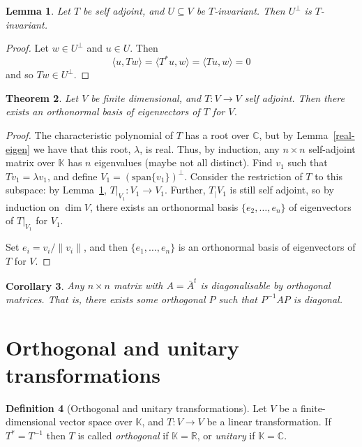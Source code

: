 \documentclass[10pt,fleqn]{article}
\newcommand{\spa}{\mathrm{span}}
\newcommand{\comps}{\mathbb{C}}
\newcommand{\reals}{\mathbb{R}}
\theoremstyle{definition} \newtheorem{defn}{Definition}[section]
\theoremstyle{plain}      \newtheorem{thm}[defn]{Theorem}
\theoremstyle{plain}      \newtheorem{prop}[defn]{Proposition}
\theoremstyle{plain}      \newtheorem{lem}[defn]{Lemma}
\theoremstyle{plain}      \newtheorem{cor}[defn]{Corollary}
\theoremstyle{plain}      \newtheorem{ad}[defn]{Addendum}
\theoremstyle{definition} \newtheorem{ex}[defn]{Example}
\theoremstyle{definition} \newtheorem{rem}[defn]{Remark}
\numberwithin{equation}{subsection}
\begin{document}
\begin{lem}\label{perp-invar}
    Let $T$ be self adjoint, and $U\subseteq V$ be $T$-invariant.
    Then $U^{\perp}$ is $T$-invariant.
\end{lem}

\begin{proof}
    Let $w\in U^{\perp}$ and $u\in U$.
    Then
    \[
        \langle u,Tw\rangle=
        \langle T^*u,w\rangle=
        \langle Tu,w\rangle=
        0
    \]
    and so $Tw\in U^{\perp}$.
\end{proof}

\begin{thm}
    Let $V$ be finite dimensional, and $T:V\to V$ self adjoint.
    Then there exists an orthonormal basis of eigenvectors of $T$ for $V$.
\end{thm}

\begin{proof}
    The characteristic polynomial of $T$ has a root over $\comps$, but by Lemma~\ref{real-eigen} we have that this root, $\lambda$, is real.
    Thus, by induction, any $n\times n$ self-adjoint matrix over $\mathbb{K}$ has $n$ eigenvalues (maybe not all distinct).
    Find $v_1$ such that $Tv_1=\lambda v_1$, and define $V_1=(\spa\{v_1\})^{\perp}$.
    Consider the restriction of $T$ to this subspace: by Lemma~\ref{perp-invar}, $T|_{V_1}:V_1\to V_1$.
    Further, $T_|{V_1}$ is still self adjoint, so by induction on $\dim V$, there exists an orthonormal basis $\{e_2,\ldots,e_n\}$ of eigenvectors of $T|_{V_1}$ for $V_1$.

    Set $e_i=v_i/\|v_i\|$, and then $\{e_1,\ldots,e_n\}$ is an orthonormal basis of eigenvectors of $T$ for $V$.
\end{proof}

\begin{cor}
    Any $n\times n$ matrix with $A=\bar{A}^t$ is diagonalisable by orthogonal matrices.
    That is, there exists some orthogonal $P$ such that $P^{-1}AP$ is diagonal.
\end{cor}


\section{Orthogonal and unitary transformations}

\begin{defn}[Orthogonal and unitary transformations]
    Let $V$ be a finite-dimensional vector space over $\mathbb{K}$, and $T:V\to V$ be a linear transformation.
    If $T^*=T^{-1}$ then $T$ is called \emph{orthogonal} if $\mathbb{K}=\reals$, or \emph{unitary} if $\mathbb{K}=\comps$.
\end{defn}
\end{document}
